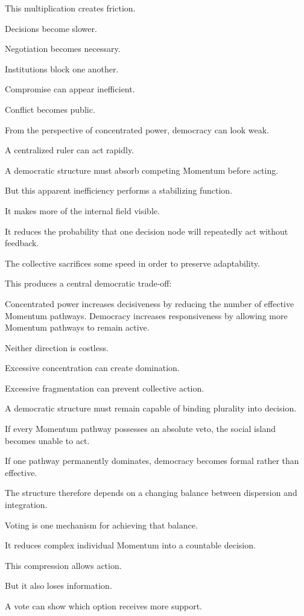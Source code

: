 This multiplication creates friction.

Decisions become slower.

Negotiation becomes necessary.

Institutions block one another.

Compromise can appear inefficient.

Conflict becomes public.

From the perspective of concentrated power, democracy can look weak.

A centralized ruler can act rapidly.

A democratic structure must absorb competing Momentum before acting.

But this apparent inefficiency performs a stabilizing function.

It makes more of the internal field visible.

It reduces the probability that one decision node will repeatedly act without feedback.

The collective sacrifices some speed in order to preserve adaptability.

This produces a central democratic trade-off:

Concentrated power increases decisiveness by reducing the number of effective Momentum pathways. Democracy increases responsiveness by allowing more Momentum pathways to remain active.

Neither direction is costless.

Excessive concentration can create domination.

Excessive fragmentation can prevent collective action.

A democratic structure must remain capable of binding plurality into decision.

If every Momentum pathway possesses an absolute veto, the social island becomes unable to act.

If one pathway permanently dominates, democracy becomes formal rather than effective.

The structure therefore depends on a changing balance between dispersion and integration.

Voting is one mechanism for achieving that balance.

It reduces complex individual Momentum into a countable decision.

This compression allows action.

But it also loses information.

A vote can show which option receives more support.

